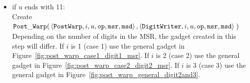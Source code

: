 \begin{itemize}
\begin{itemize}
            \item if $u$ ends with 11:\\
            Create
            $\begin{aligned}[t]
                {\tt Post\_Warp}(& \left \langle {\tt PostWarp},    i, u, {\tt op}, {\tt msr}, {\tt msd} \right\rangle,
                            \left \langle {\tt DigitWriter}, i, u, {\tt op}, {\tt msr}, {\tt msd} \right\rangle \;)
            \end{aligned}$ \\
            Depending on the number of digits in the MSR, the gadget created in this step will differ.
            If $i$ is 1 (case 1) use the general gadget in Figure~\ref{fig:post_warp_case1_digit1_msr}.
            If $i$ is 2 (case 2) use the general gadget in Figure~\ref{fig:post_warp_case2_digit2_msr}.
            If $i$ is 3 (case 3) use the general gadget in Figure~\ref{fig:post_warp_general_digit2and3}.
            \vspace{.5cm}

        \end{itemize}



\end{itemize}
